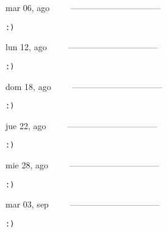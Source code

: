 \documentclass[letterpaper,10pt]{article}
\begin{document}
\begin{multicols}{3}
{mar 06, ago\ \ \ \ \ --------------------------------}
\begin{flushright}\begin{small}\texttt{:)}\end{small}\end{flushright}
\vfill
{lun 12, ago\ \ \ \ \ --------------------------------}
\begin{flushright}\begin{small}\texttt{:)}\end{small}\end{flushright}\par
\vfill
{dom 18, ago\ \ \ \ \ --------------------------------}
\begin{flushright}\begin{small}\texttt{:)}\end{small}\end{flushright}\par
\vfill
\end{multicols}
\vspace{1.05cm}

\begin{multicols}{3}
{jue 22, ago\ \ \ \ \ --------------------------------}
\begin{flushright}\begin{small}\texttt{:)}\end{small}\end{flushright}
\vfill
{mie 28, ago\ \ \ \ \ --------------------------------}
\begin{flushright}\begin{small}\texttt{:)}\end{small}\end{flushright}\par
\vfill
{mar 03, sep\ \ \ \ \ --------------------------------}
\begin{flushright}\begin{small}\texttt{:)}\end{small}\end{flushright}\par
\vfill
\end{multicols}
\vspace{1.05cm}
\end{document}
